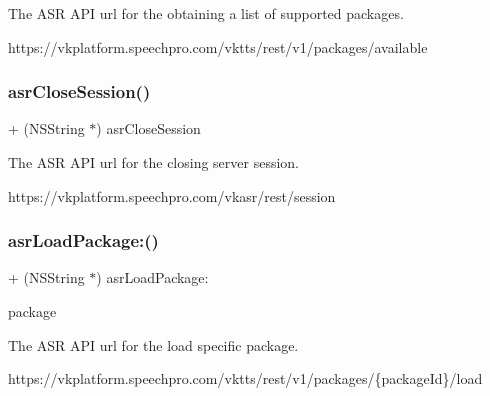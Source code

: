 The A\+SR A\+PI url for the obtaining a list of supported packages. 
\begin{DoxyCode}
https:\textcolor{comment}{//vkplatform.speechpro.com/vktts/rest/v1/packages/available}
\end{DoxyCode}
 \hypertarget{interface_s_t_c_a_s_r_u_r_l_manager_ababc0e137a24e84452de092b2ad1b0ac}{}\label{interface_s_t_c_a_s_r_u_r_l_manager_ababc0e137a24e84452de092b2ad1b0ac} 
\subsubsection{\texorpdfstring{asr\+Close\+Session()}{asrCloseSession()}}
{\footnotesize\ttfamily + (N\+S\+String $\ast$) asr\+Close\+Session \begin{DoxyParamCaption}{ }\end{DoxyParamCaption}}

The A\+SR A\+PI url for the closing server session. 
\begin{DoxyCode}
https:\textcolor{comment}{//vkplatform.speechpro.com/vkasr/rest/session}
\end{DoxyCode}
 \hypertarget{interface_s_t_c_a_s_r_u_r_l_manager_ad122fbe5414da177778397e6bac2f68b}{}\label{interface_s_t_c_a_s_r_u_r_l_manager_ad122fbe5414da177778397e6bac2f68b} 
\subsubsection{\texorpdfstring{asr\+Load\+Package\+:()}{asrLoadPackage:()}}
{\footnotesize\ttfamily + (N\+S\+String $\ast$) asr\+Load\+Package\+: \begin{DoxyParamCaption}\item[{(N\+S\+String $\ast$)}]{package }\end{DoxyParamCaption}}

The A\+SR A\+PI url for the load specific package. 
\begin{DoxyCode}
https:\textcolor{comment}{//vkplatform.speechpro.com/vktts/rest/v1/packages/\{packageId\}/load}
\end{DoxyCode}
 \hypertarget{interface_s_t_c_a_s_r_u_r_l_manager_a7a3686701a8f1274bb1d4d2a83be7551}{}\label{interface_s_t_c_a_s_r_u_r_l_manager_a7a3686701a8f1274bb1d4d2a83be7551} 
